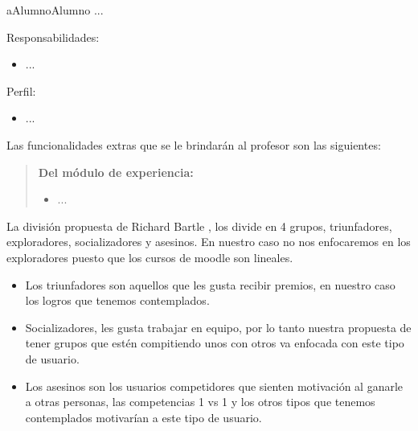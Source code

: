     \begin{actor}{aAlumno}{Alumno}{%
        ...}

    \item[Responsabilidades:] \hfill
        \begin{itemize}
        \item ...
        \end{itemize}

    \item[Perfil:] \hfill
        \begin{itemize}
        \item ...
        \end{itemize}
    \end{actor}

 \noindent
 Las funcionalidades extras que se le brindarán al profesor son las siguientes:

    \begin{quote}

    {\bf Del módulo de experiencia:}
        \begin{itemize}
        \item ...
        \end{itemize}

    \end{quote}

 La división propuesta de Richard Bartle \cite{TiposDeUsuario}, los divide en 4 grupos, triunfadores,
 exploradores, socializadores y asesinos. En nuestro caso no nos enfocaremos en los exploradores
 puesto que los cursos de moodle son lineales.
    
    \begin{itemize}
    \item Los triunfadores son aquellos que les gusta recibir premios, en nuestro caso
          los logros que tenemos contemplados.

    \item Socializadores, les gusta trabajar en equipo, por lo tanto nuestra propuesta
          de tener grupos que estén compitiendo unos con otros va enfocada con este tipo
          de usuario.

    \item Los asesinos son los usuarios competidores que sienten motivación al ganarle
          a otras personas, las competencias 1 vs 1 y los otros tipos que tenemos
          contemplados motivarían a este tipo de usuario.
    \end{itemize}
    
